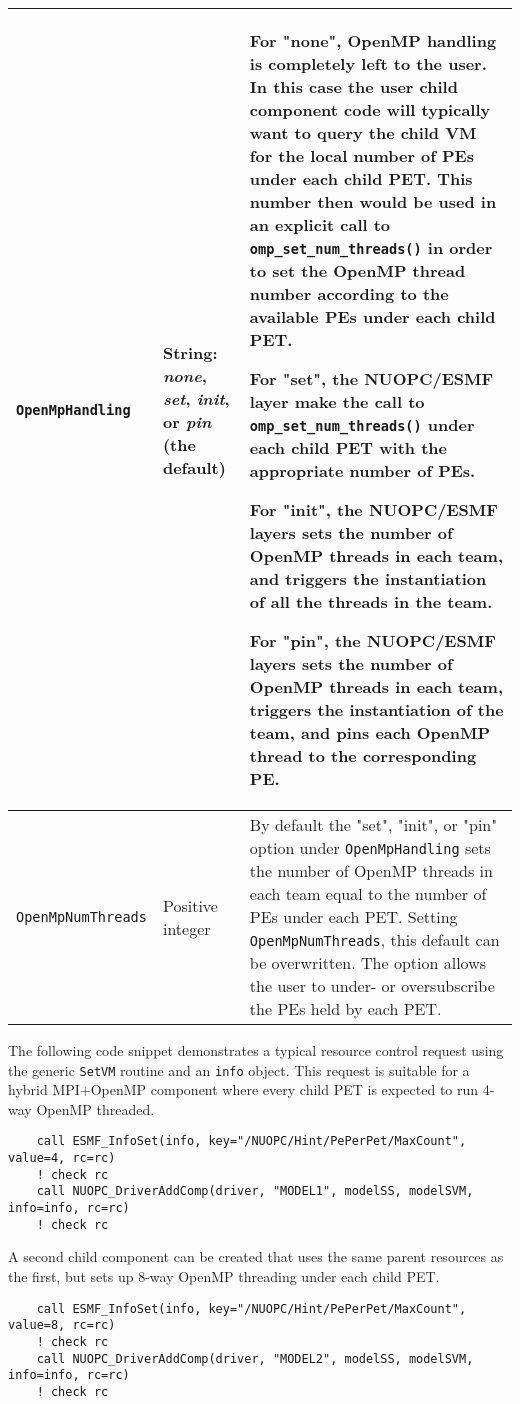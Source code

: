 \begin{longtable}[h]{|p{}|p{}|p{}|}
     {\tt OpenMpHandling}   & String: {\em none}, {\em set}, {\em init}, or {\em pin} (the default) &
        For "none", OpenMP handling is completely left to the user. In this case the user child component code will typically want to query the child VM for the local number of PEs under each child PET. This number then would be used in an explicit call to {\tt omp\_set\_num\_threads()} in order to set the OpenMP thread number according to the available PEs under each child PET.
        
        For "set", the NUOPC/ESMF layer make the call to {\tt omp\_set\_num\_threads()} under each child PET with the appropriate number of PEs.
        
        For "init", the NUOPC/ESMF layers sets the number of OpenMP threads in each team, and triggers the instantiation of all the threads in the team.

        For "pin", the NUOPC/ESMF layers sets the number of OpenMP threads in each team, triggers the instantiation of the team, and pins each OpenMP thread to the corresponding PE.
        \\ \hline

     {\tt OpenMpNumThreads} & Positive integer   &
        By default the "set", "init", or "pin" option under {\tt OpenMpHandling} sets the number of OpenMP threads in each team equal to the number of PEs under each PET. Setting {\tt OpenMpNumThreads}, this default can be overwritten. The option allows the user to under- or oversubscribe the PEs held by each PET.\\ \hline\hline
\end{longtable}

The following code snippet demonstrates a typical resource control request using the generic {\tt SetVM} routine and an {\tt info} object. This request is suitable for a hybrid MPI+OpenMP component where every child PET is expected to run 4-way OpenMP threaded.

\begin{verbatim}
    call ESMF_InfoSet(info, key="/NUOPC/Hint/PePerPet/MaxCount", value=4, rc=rc)
    ! check rc
    call NUOPC_DriverAddComp(driver, "MODEL1", modelSS, modelSVM, info=info, rc=rc)
    ! check rc
\end{verbatim}

A second child component can be created that uses the same parent resources as the first, but sets up 8-way OpenMP threading under each child PET.

\begin{verbatim}
    call ESMF_InfoSet(info, key="/NUOPC/Hint/PePerPet/MaxCount", value=8, rc=rc)
    ! check rc
    call NUOPC_DriverAddComp(driver, "MODEL2", modelSS, modelSVM, info=info, rc=rc)
    ! check rc
\end{verbatim}


